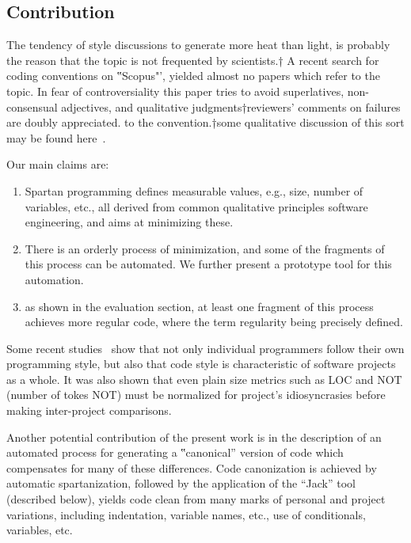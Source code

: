 \subsection{Contribution}

The tendency of style discussions to generate more heat than light, is probably
the reason that the topic is not frequented by scientists.†{%
  A recent search for coding conventions on ‟Scopus"', yielded almost no papers which
refer to the topic.} In fear of controversiality this paper tries to avoid
superlatives, non-consensual adjectives, and qualitative judgments†{reviewers'
comments on failures are doubly appreciated.} to the
convention.†{some qualitative discussion of this
  sort may be found here~\cite{Gil:2010}.} 
  
 Our main claims are:  
\begin{enumerate}
    \item Spartan programming defines measurable values, e.g., size, number of
      variables, etc., all derived from common qualitative principles
        software engineering, and aims at minimizing these.  
    \item There is an orderly process of minimization, 
      and some of the fragments of this process can be automated.
      We further present a prototype tool for this automation. 
    \item as shown in the evaluation section, at least one fragment of this
      process achieves more regular code, where the term regularity being
      precisely defined.
\end{enumerate}

Some recent studies~\cite{%
  Gil:Lalouche:16,%
  Goldstein:Moshkovich:2011,
  Zhang:Zheng:Ying:Hassan:2016,
} show that not only individual programmers follow their own programming style,
but also that code style is characteristic of software projects as a whole. It
was also shown that even plain size metrics such as LOC and NOT (number of
tokes NOT) must be normalized for project's idiosyncrasies before making
inter-project comparisons.

Another potential contribution of the present work is in the description of an
automated process for generating a ‟canonical” version of code which
compensates for many of these differences.  Code canonization is achieved by
automatic spartanization, followed by the application of the ``Jack'' tool
(described below), yields code clean from many marks of personal and project
variations, including indentation, variable names, etc., use of conditionals,
variables, etc.

